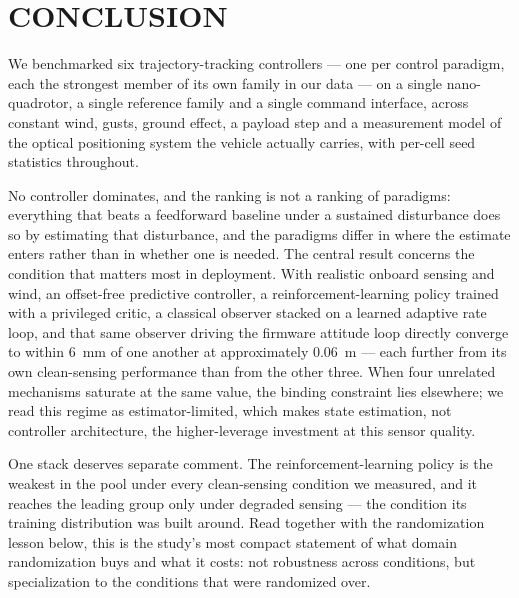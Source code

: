 \section{CONCLUSION}
\label{sec:conclusion}

We benchmarked six trajectory-tracking controllers --- one per control paradigm, each
the strongest member of its own family in our data --- on a single nano-quadrotor, a
single reference family and a single command interface, across constant wind, gusts,
ground effect, a payload step and a measurement model of the optical positioning system
the vehicle actually carries, with per-cell seed statistics throughout.

No controller dominates, and the ranking is not a ranking of paradigms: everything that
beats a feedforward baseline under a sustained disturbance does so by estimating that
disturbance, and the paradigms differ in where the estimate enters rather than in
whether one is needed. The central result concerns the condition that matters most in
deployment. With realistic onboard sensing and wind,
an offset-free predictive controller, a reinforcement-learning policy trained with a
privileged critic, a classical observer stacked on a learned adaptive rate loop, and that
same observer driving the firmware attitude loop directly converge to within
\SI{6}{\milli\meter} of one another at approximately \SI{0.06}{\meter} --- each further
from its own clean-sensing performance than from the other three. When four unrelated
mechanisms saturate at the same value, the binding constraint lies elsewhere; we read
this regime as estimator-limited, which makes state estimation, not controller
architecture, the higher-leverage investment at this sensor quality.

One stack deserves separate comment. The reinforcement-learning policy is the weakest in
the pool under every clean-sensing condition we measured, and it reaches the leading
group only under degraded sensing --- the condition its training distribution was built
around. Read together with the randomization lesson below, this is the study's most
compact statement of what domain randomization buys and what it costs: not robustness
across conditions, but specialization to the conditions that were randomized over.

